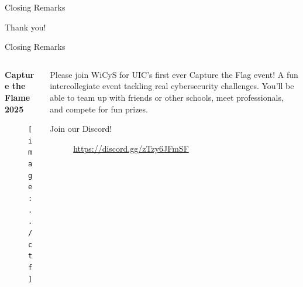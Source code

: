 \documentclass{beamer}
\begin{document}
\begin{frame}{Closing Remarks}
	\begin{center}
		\Huge Thank you!
	\end{center}
\end{frame}

\begin{frame}{Closing Remarks}
		\begin{columns}
		\begin{column}{0.5\textwidth}
			\textbf{Capture the Flame 2025}
		\begin{figure}
			\centering
			\texttt{[image: ../ctf]}
			\caption{}
			\label{fig:ctf}
		\end{figure}
		\end{column}
		\begin{column}{0.5\textwidth}
			Please join WiCyS for UIC's first ever Capture the Flag event! A fun intercollegiate event tackling real cybersecurity challenges. You'll be able to team up with friends or other schools, meet professionals, and compete for fun prizes. 
			
			\bigskip
			Join our Discord!
			
			\begin{figure}
				\centering
				
				\caption{\url{https://discord.gg/zTzy6JFmSF}}
			\end{figure}
		\end{column}
	\end{columns}
\end{frame}
\end{document}
